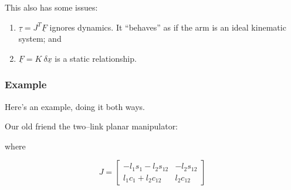 \documentclass[]{article}
\begin{document}
This also has some issues:
\begin{enumerate}
 \item $\underline{\tau} = J^{T}\underline{F}$ ignores dynamics. It ``behaves'' as if the arm is an ideal kinematic system; and
 \item $\underline{F}=K\ \delta\underline{x}$ is a static relationship.
\end{enumerate}

\subsubsection{Example}
Here's an example, doing it both ways.

Our old friend the two--link planar manipulator:
\begin{figure}[!h]
\centering
{}
\end{figure}

where

\begin{displaymath}
 J = \left[\begin{array}{cc} -l_{1}s_{1}-l_{2}s_{12} & -l_{2}s_{12} \\ l_{1}c_{1}+l_{2}c_{12} & l_{2}c_{12} \end{array} \right]
\end{displaymath}
\end{document}

